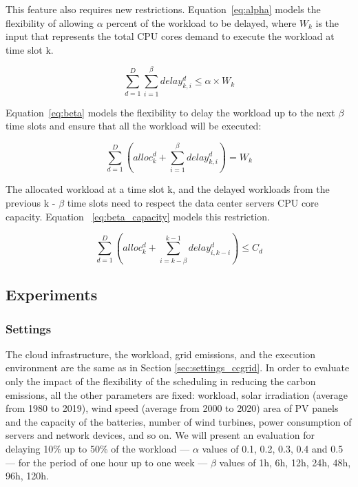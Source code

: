This feature also requires new restrictions. Equation~\eqref{eq:alpha} models the flexibility of allowing $\alpha$ percent of the workload to be delayed, where $W_k$ is the input that represents the total CPU cores demand to execute the workload at time slot k.


\begin{equation} \label{eq:alpha}
   \sum_{d=1}^D  \sum_{i=1}^{\beta} delay_{k,i}^d \leq  \alpha   \times W_k
\end{equation}


Equation~\eqref{eq:beta} models the flexibility to delay the workload up to the next $\beta$ time slots and ensure that all the workload will be executed:


\begin{equation} \label{eq:beta}
       \sum_{d=1}^D    (  alloc_k^d +    \sum_{i=1}^{\beta} delay_{k,i}^d  ) = W_k  
     \end{equation}

The allocated workload at a time slot k, and the delayed workloads from the previous k - $\beta$ time slots need to respect the data center servers CPU core capacity. Equation ~\eqref{eq:beta_capacity} models this restriction. 

\begin{equation} \label{eq:beta_capacity}
\sum_{d=1}^D    (  alloc_k^d  +    \sum_{i=k-\beta}^{k-1} delay_{  i ,  k-i  }^d  )  \leq C_d 
\end{equation}

\subsection{Experiments}

\subsubsection{Settings}

The cloud infrastructure, the workload, grid emissions, and the execution environment are the same as in Section  \ref{sec:settings_ccgrid}. In order to evaluate only the impact of the flexibility of the scheduling in reducing the carbon emissions, all the other parameters are fixed: workload, solar irradiation (average from 1980 to 2019), wind speed (average from 2000 to 2020) area of PV panels and the capacity of the batteries, number of wind turbines, power consumption of servers and network devices, and so on. We will present an evaluation for delaying 10\% up to 50\% of the workload --- $\alpha$ values of 0.1, 0.2, 0.3, 0.4 and 0.5 --- for the period of one hour up to one week --- $\beta$ values of 1h, 6h, 12h, 24h, 48h, 96h, 120h.


